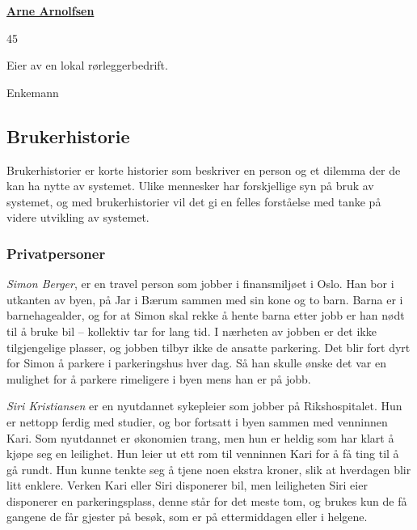 \vspace{1em} 
\noindent\textbf{\underline{Arne Arnolfsen}}
\vspace{-1em}
\begin{description}[style=multiline,leftmargin=2.2cm]
\item[Alder:] 45
\item[Arbeid:]  Eier av en lokal rørleggerbedrift.
\item[Sivilstatus:] Enkemann

\end{description}



\subsection{Brukerhistorie}
Brukerhistorier er korte historier som beskriver en person og et dilemma der de kan ha nytte av systemet. Ulike mennesker har forskjellige syn på bruk av systemet, og med brukerhistorier vil det gi en felles forståelse med tanke på videre utvikling av systemet.

\subsubsection{Privatpersoner}
\textit{Simon Berger}, er en travel person som jobber i finansmiljøet i Oslo. Han bor i utkanten av byen, på Jar i Bærum sammen med sin kone og to barn. Barna er i barnehagealder, og for at Simon skal rekke å hente barna etter jobb er han nødt til å bruke bil – kollektiv tar for lang tid. I nærheten av jobben er det ikke tilgjengelige plasser, og jobben tilbyr ikke de ansatte parkering. Det blir fort dyrt for Simon å parkere i parkeringshus hver dag. Så han skulle ønske det var en mulighet for å parkere rimeligere i byen mens han er på jobb.



\textit{Siri Kristiansen} er en nyutdannet sykepleier som jobber på Rikshospitalet. Hun er nettopp ferdig med studier, og bor fortsatt i byen sammen med venninnen Kari. Som nyutdannet er økonomien trang, men hun er heldig som har klart å kjøpe seg en leilighet. Hun leier ut ett rom til venninnen Kari for å få ting til å gå rundt. Hun kunne tenkte seg å tjene noen ekstra kroner, slik at hverdagen blir litt enklere. Verken Kari eller Siri disponerer bil, men leiligheten Siri eier disponerer en parkeringsplass, denne står for det meste tom, og brukes kun de få gangene de får gjester på besøk, som er på ettermiddagen eller i helgene.  


